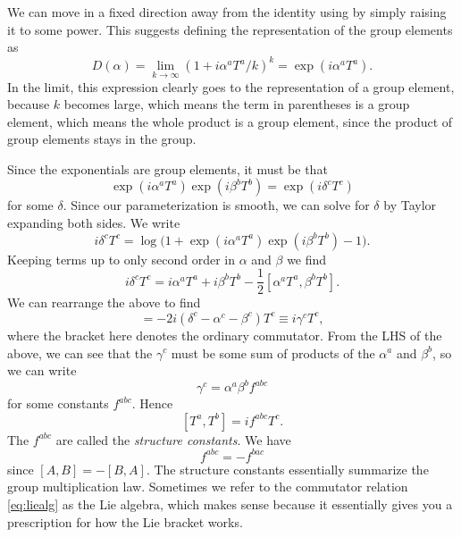 We can move in a fixed direction away from the identity using
 by simply raising it to some power. This suggests
defining the representation of the group elements as
\begin{equation}
  D(\alpha)=\lim_{k\to\infty}\left(1+i\alpha^aT^a/k\right)^k
           =\exp(i\alpha^aT^a).
\end{equation}
In the limit, this expression clearly goes to the representation of a group 
element, because $k$ becomes large, which means the term in parentheses is a 
group element, which means the whole product is a group element, since the
product of group elements stays in the group.

Since the exponentials are group elements, it must be that
\begin{equation}
  \exp(i\alpha^aT^a)\exp(i\beta^bT^b)=\exp(i\delta^cT^c)
\end{equation}
for some $\delta$. Since our parameterization is smooth, we can solve for
$\delta$ by Taylor expanding both sides. We write
\begin{equation}
  i\delta^cT^c=\log\big(1+\exp(i\alpha^aT^a)\exp(i\beta^bT^b)-1\big).
\end{equation}
Keeping terms up to only second order in $\alpha$ and $\beta$ we find
\begin{equation}
  i\delta^cT^c=i\alpha^aT^a+i\beta^bT^b-\frac{1}{2}[\alpha^aT^a,\beta^bT^b].
\end{equation}
We can rearrange the above to find
\begin{equation}
  [\alpha^aT^a,\beta^bT^b]=
   -2i(\delta^c-\alpha^c-\beta^c)T^c\equiv i\gamma^cT^c,
\end{equation}
where the bracket here denotes the ordinary commutator.
From the LHS of the above, we can see that the $\gamma^c$ must be some
sum of products of the $\alpha^a$ and $\beta^b$, so we can write
\begin{equation}\label{eq:gammac}
  \gamma^c=\alpha^a\beta^bf^{abc}
\end{equation}
for some constants $f^{abc}$. Hence
\begin{equation}\label{eq:liealg}
  [T^a,T^b]=if^{abc}T^c.
\end{equation}
The $f^{abc}$ are called the {\it structure constants}. 
We have
\begin{equation}
  f^{abc}=-f^{bac}
\end{equation}
since $[A,B]=-[B,A]$. The structure constants essentially summarize the
group multiplication law. Sometimes we refer to the commutator relation
\eqref{eq:liealg} as the Lie algebra, which makes sense because it
essentially gives you a prescription for how the Lie bracket works.

